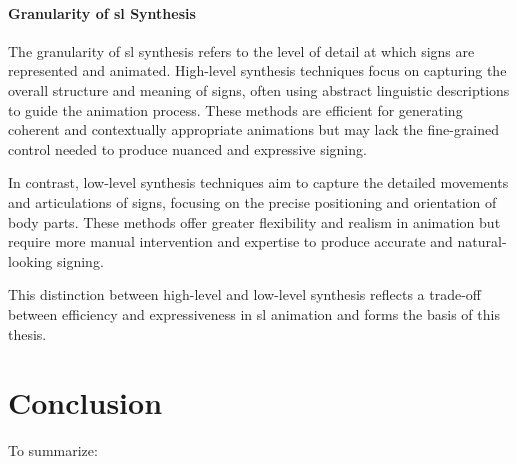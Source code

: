 \documentclass[../../main.tex]{subfiles}
\begin{document}
\paragraph{Granularity of \gls{sl} Synthesis}
\label{ch:background_work:sign_language_synthesis:3d_techniques:sign_language_synthesis_systems:granularity_of_sl_synthesis}

The granularity of \gls{sl} synthesis refers to the level of detail at which signs are represented and animated. High-level synthesis techniques focus on capturing the overall structure and meaning of signs, often using abstract linguistic descriptions to guide the animation process. These methods are efficient for generating coherent and contextually appropriate animations but may lack the fine-grained control needed to produce nuanced and expressive signing.

In contrast, low-level synthesis techniques aim to capture the detailed movements and articulations of signs, focusing on the precise positioning and orientation of body parts. These methods offer greater flexibility and realism in animation but require more manual intervention and expertise to produce accurate and natural-looking signing.

This distinction between high-level and low-level synthesis reflects a trade-off between efficiency and expressiveness in \gls{sl} animation and forms the basis of this thesis.

\section{Conclusion}
\label{ch:background_work:conclusion}

To summarize:
\end{document}
